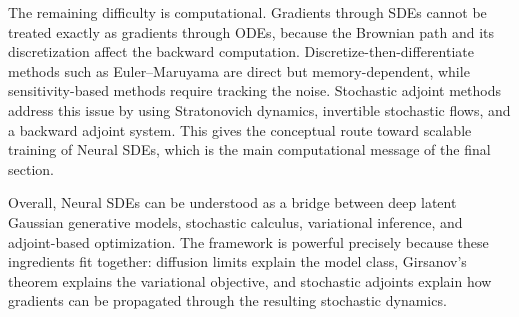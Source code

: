 \documentclass[11pt]{article}
\begin{document}
The remaining difficulty is computational. Gradients through SDEs cannot be treated exactly as gradients through ODEs, because the Brownian path and its discretization affect the backward computation. Discretize-then-differentiate methods such as Euler--Maruyama are direct but memory-dependent, while sensitivity-based methods require tracking the noise. Stochastic adjoint methods address this issue by using Stratonovich dynamics, invertible stochastic flows, and a backward adjoint system. This gives the conceptual route toward scalable training of Neural SDEs, which is the main computational message of the final section.

Overall, Neural SDEs can be understood as a bridge between deep latent Gaussian generative models, stochastic calculus, variational inference, and adjoint-based optimization. The framework is powerful precisely because these ingredients fit together: diffusion limits explain the model class, Girsanov's theorem explains the variational objective, and stochastic adjoints explain how gradients can be propagated through the resulting stochastic dynamics.
\end{document}
